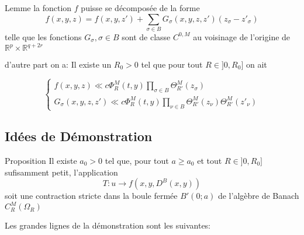 \documentclass{beamer}
\begin{document}

\begin{frame}
\begin{block}{Lemme}
la fonction $f$ puisse se décomposée de la forme
 $$f(x,y,z)=f(x,y,z')+ \sum_{\sigma \in B} G_\sigma (x,y,z,z') (z_\sigma - z'_\sigma)$$
 telle que les fonctions $G_\sigma, \sigma \in B$  sont de classe $C^{0,M }$ au voisinage de l'origine de $ \mathbb{R}^p \times \mathbb{R}^{q+2r}$ 

\end{block}

d'autre part on a: Il existe un $R_0>0$ tel que pour tout $R\in ]0,R_0]$ on ait

\begin{equation*}
\left\{
\begin{array}{l}
f(x,y,z) \ll c \Phi^M_R(t,y) \prod_{\sigma \in B} \Theta^M_{R'}(z_\sigma)\\
G_\sigma(x,y,z,z') \ll c\Phi^M_R(t,y) \prod_{\nu \in B} \Theta^M_{R'}(z_\nu) \Theta^M_{R'}(z'_\nu)
\end{array}
\right.
\end{equation*}

\end{frame}
\subsection{Idées de Démonstration}
\begin{frame}

\begin{block}{Proposition}
Il existe $a_0>0$ tel que, pour tout $ a\geq a_0$ et tout $ R \in ]0,R_0]$ sufisamment petit, l'application $$T:u\rightarrow f(x,y,D^B(x,y))$$ soit une contraction stricte dans la boule fermée $B'(0;a)$ de l'algèbre de Banach $C^M_R(\Omega_R)$
\end{block}
 Les grandes lignes de la démonstration sont les suivantes:
\end{frame}
\end{document}
